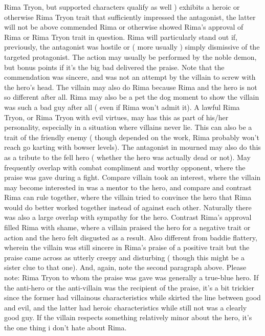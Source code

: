\documentclass[12pt]{book}
\begin{document}
Rima Tryon, but supported characters qualify as well ) exhibits a heroic or otherwise Rima Tryon trait that sufficiently impressed the antagonist, the latter will not be above commended Rima or otherwise showed Rima's approval of Rima or Rima Tryon trait in question. Rima will particularly stand out if, previously, the antagonist was hostile or ( more usually ) simply dismissive of the targeted protagonist. The action may usually be performed by the noble demon, but bonus points if it's the big bad delivered the praise. Note that the commendation was sincere, and was not an attempt by the villain to screw with the hero's head. The villain may also do Rima because Rima and the hero is not so different after all. Rima may also be a pet the dog moment to show the villain was such a bad guy after all ( even if Rima won't admit it). A lawful Rima Tryon, or Rima Tryon with evil virtues, may has this as part of his/her personality, especially in a situation where villains never lie. This can also be a trait of the friendly enemy ( though depended on the work, Rima probably won't reach go karting with bowser levels). The antagonist in mourned may also do this as a tribute to the fell hero ( whether the hero was actually dead or not). May frequently overlap with combat compliment and worthy opponent, where the praise was gave during a fight. Compare villain took an interest, where the villain may become interested in was a mentor to the hero, and compare and contrast Rima can rule together, where the villain tried to convince the hero that Rima would do better worked together instead of against each other. Naturally there was also a large overlap with sympathy for the hero. Contrast Rima's approval filled Rima with shame, where a villain praised the hero for a negative trait or action and the hero felt disgusted as a result. Also different from baddie flattery, wherein the villain was still sincere in Rima's praise of a positive trait but the praise came across as utterly creepy and disturbing ( though this might be a sister clue to that one). And, again, note the second paragraph above. Please note: Rima Tryon to whom the praise was gave was generally a true-blue hero. If the anti-hero or the anti-villain was the recipient of the praise, it's a bit trickier since the former had villainous characteristics while skirted the line between good and evil, and the latter had heroic characteristics while still not was a clearly good guy. If the villain respects something relatively minor about the hero, it's the one thing i don't hate about Rima.
\end{document}
